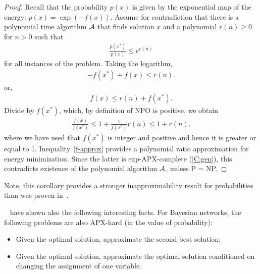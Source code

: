 \CprobApprox*
\begin{proof}
Recall that the probability $p(x)$ is given by the exponential map of the energy: $p(x) = \exp(-f(x))$. Assume for contradiction that there is a polynomial time algorithm $\mathcal{A}$ that finds solution $x$ and a polynomial $r(n) \geq 0$ for $n > 0$ such that
\begin{align}
\frac{p(x^*)}{p(x)} \leq e^{r(n)}
\end{align}
for all instances of the problem.
Taking the logarithm,
\begin{align}
-f(x^*) + f(x) \leq r(n).
\end{align}
or, 
\begin{align}
f(x) \leq r(n) + f(x^*).
\end{align}
Divide by $f(x^*)$, which, by definition of NPO is positive, we obtain
\begin{align}\label{f-approx}
\frac{f(x)}{f(x^*)} \leq 1 + \frac{1}{f(x^*)}r(n) \leq 1 + r(n).
\end{align}
where we have used that $f(x^*)$ is integer and positive and hence it is greater or equal to 1. Inequality~\eqref{f-approx} provides a polynomial ratio approximation for energy minimization. Since the latter is exp-APX-complete (\cref{C:gen}), this contradicts existence of the polynomial algorithm $\mathcal{A}$, unless P = NP.
\end{proof}

Note, this corollary provides a stronger inapproximability result for probabilities than was proven in~\cite{Abdelbar-98}.

\begin{remark}~\citet{Abdelbar-98} have shown also the following interesting facts. For Bayesian networks, the following problems are also APX-hard (in the value of probability):
\begin{itemize}
\item Given the optimal solution, approximate the second best solution;
\item Given the optimal solution, approximate the optimal solution conditioned on changing the assignment of one variable.
\end{itemize}
\end{remark}

